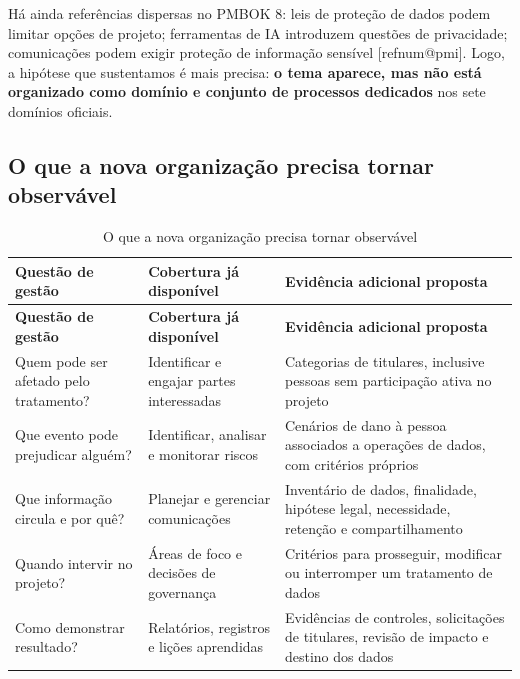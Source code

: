 \documentclass[12pt,a4paper,article,oneside,english,brazil]{abntex2}
\makeatletter
\newcommand{\fontetab}[1]{\par\vspace{3pt}{\small\noindent Fonte: #1\par}}
\newcommand{\refnum}[1]{\csname refnum@#1\endcsname}
\makeatother
\begin{document}
Há ainda referências dispersas no PMBOK 8: leis de proteção de dados podem limitar opções de projeto; ferramentas de IA introduzem questões de privacidade; comunicações podem exigir proteção de informação sensível [\refnum{pmi}]. Logo, a hipótese que sustentamos é mais precisa: \textbf{o tema aparece, mas não está organizado como domínio e conjunto de processos dedicados} nos sete domínios oficiais.
\subsection{O que a nova organização precisa tornar observável}

\begingroup\SingleSpacing\small
\begin{longtable}{@{}>{\raggedright\arraybackslash}p{}>{\raggedright\arraybackslash}p{}>{\raggedright\arraybackslash}p{}@{}}
\caption{O que a nova organização precisa tornar observável}\label{tab:t1}\\
\hline
\textbf{Questão de gestão} & \textbf{Cobertura já disponível} & \textbf{Evidência adicional proposta}\\
\hline
\endfirsthead
\hline
\textbf{Questão de gestão} & \textbf{Cobertura já disponível} & \textbf{Evidência adicional proposta}\\
\hline
\endhead
\hline
\endfoot
\hline
\endlastfoot
Quem pode ser afetado pelo tratamento? & Identificar e engajar partes interessadas & Categorias de titulares, inclusive pessoas sem participação ativa no projeto\\[3pt]
Que evento pode prejudicar alguém? & Identificar, analisar e monitorar riscos & Cenários de dano à pessoa associados a operações de dados, com critérios próprios\\[3pt]
Que informação circula e por quê? & Planejar e gerenciar comunicações & Inventário de dados, finalidade, hipótese legal, necessidade, retenção e compartilhamento\\[3pt]
Quando intervir no projeto? & Áreas de foco e decisões de governança & Critérios para prosseguir, modificar ou interromper um tratamento de dados\\[3pt]
Como demonstrar resultado? & Relatórios, registros e lições aprendidas & Evidências de controles, solicitações de titulares, revisão de impacto e destino dos dados\\[3pt]
\end{longtable}
\endgroup
\fontetab{Elaborado pelos autores (2026).}
\end{document}
